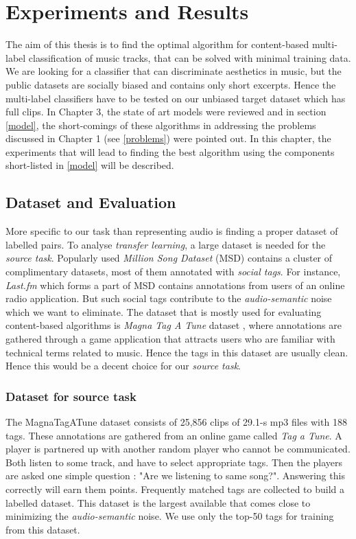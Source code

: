 

\chapter{Experiments and Results} %

\label{Chapter4} %

The aim of this thesis is to find the optimal algorithm for content-based multi-label classification of music tracks, that can be solved with minimal training data. We are looking for a classifier that can discriminate aesthetics in music, but the public datasets are socially biased and contains only short excerpts. Hence the multi-label classifiers have to be tested on our unbiased target dataset which has full clips. In Chapter 3, the state of art models were reviewed and in section \ref{model}, the short-comings of these algorithms in addressing the problems discussed in Chapter 1 (see \ref{problems}) were pointed out. In this chapter, the experiments that will lead to finding the best algorithm using the components short-listed in \ref{model} will be described.

\section{Dataset and Evaluation}
\label{dataset}
More specific to our task than representing audio is finding a proper dataset of labelled pairs. To analyse \textit{transfer learning}, a large dataset is needed for the \textit{source task}. Popularly used \textit{Million Song Dataset} (MSD) \cite{MSD} contains a cluster of complimentary datasets, most of them annotated with \textit{social tags}. For instance, \textit{Last.fm} which forms a part of MSD contains annotations from users of an online radio application. But such social tags contribute to the \textit{audio-semantic} noise which we want to eliminate. The dataset that is mostly used for evaluating content-based algorithms is \textit{Magna Tag A Tune} dataset \cite{MTT}, where annotations are gathered through a game application that attracts users who are familiar with technical terms related to music. Hence the tags in this dataset are usually clean. Hence this would be a decent choice for our \textit{source task}.

\subsection{Dataset for source task}
\label{source}
The MagnaTagATune dataset consists of 25,856 clips of 29.1-s mp3 files with 188 tags. These annotations are gathered from an online game called \textit{Tag a Tune}. A player is partnered up with another random player who cannot be communicated. Both listen to some track, and have to select appropriate tags. Then the players are asked one simple question : "Are we listening to same song?". Answering this correctly will earn them points. Frequently matched tags are collected to build a labelled dataset. This dataset is the largest available that comes close to minimizing the \textit{audio-semantic} noise. We use only the top-50 tags for training from this dataset.  

